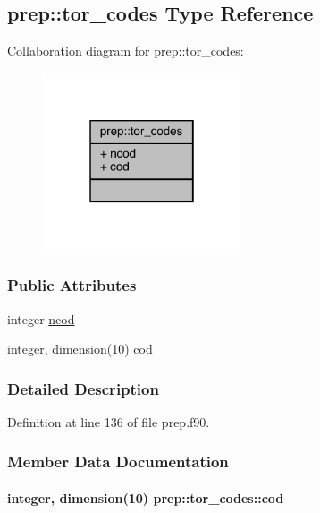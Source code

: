 \hypertarget{structprep_1_1tor__codes}{\subsection{prep\-:\-:tor\-\_\-codes Type Reference}
\label{structprep_1_1tor__codes}
}


Collaboration diagram for prep\-:\-:tor\-\_\-codes\-:
\nopagebreak
\begin{figure}[H]
\begin{center}
\leavevmode
\includegraphics[width=166pt]{structprep_1_1tor__codes__coll__graph}
\end{center}
\end{figure}
\subsubsection*{Public Attributes}
\begin{DoxyCompactItemize}
\item 
integer \hyperlink{structprep_1_1tor__codes_a7997fde522fab4d6917a08efbf41a790}{ncod}
\item 
integer, dimension(10) \hyperlink{structprep_1_1tor__codes_a4050da8e1614efc7a349003fb8a257b1}{cod}
\end{DoxyCompactItemize}


\subsubsection{Detailed Description}


Definition at line 136 of file prep.\-f90.



\subsubsection{Member Data Documentation}
\hypertarget{structprep_1_1tor__codes_a4050da8e1614efc7a349003fb8a257b1}{
\paragraph[{cod}]{\setlength{\rightskip}{0pt plus 5cm}integer, dimension(10) prep\-::tor\-\_\-codes\-::cod}}\label{structprep_1_1tor__codes_a4050da8e1614efc7a349003fb8a257b1}


